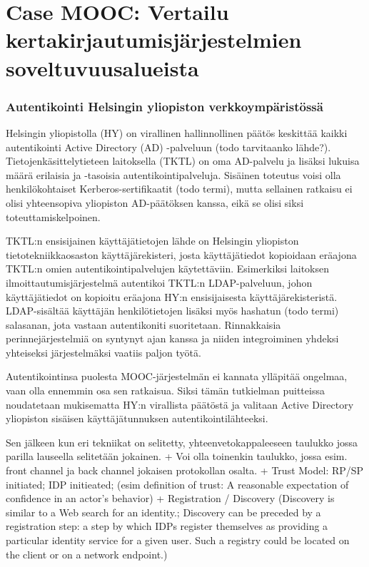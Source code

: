 \documentclass[finnish,gradu]{tktltiki}
\begin{document}
\section{Case MOOC: Vertailu kertakirjautumisjärjestelmien soveltuvuusalueista} %
\label{sec:kertakirjautumisjärjestelmien_}

  \subsubsection{Autentikointi Helsingin yliopiston verkkoympäristössä} %
  \label{ssub:autentikointi_helsingin_yliopiston_verkkoympäristössä}

  Helsingin yliopistolla (HY) on virallinen hallinnollinen päätös keskittää kaikki autentikointi Active Directory (AD) -palveluun (todo tarvitaanko lähde?).
  Tietojenkäsittelytieteen laitoksella (TKTL) on oma AD-palvelu ja lisäksi lukuisa määrä erilaisia ja -tasoisia autentikointipalveluja.
  Sisäinen toteutus voisi olla henkilökohtaiset Kerberos-sertifikaatit (todo termi), mutta sellainen ratkaisu ei olisi yhteensopiva yliopiston AD-päätöksen kanssa, eikä se olisi siksi toteuttamiskelpoinen.

  TKTL:n ensisijainen käyttäjätietojen lähde on Helsingin yliopiston tietotekniikkaosaston käyttäjärekisteri, josta käyttäjätiedot kopioidaan eräajona TKTL:n omien autentikointipalvelujen käytettäviin. Esimerkiksi laitoksen ilmoittautumisjärjestelmä autentikoi TKTL:n LDAP-palveluun, johon käyttäjätiedot on kopioitu eräajona HY:n ensisijaisesta käyttäjärekisteristä. LDAP-sisältää käyttäjän henkilötietojen lisäksi myös hashatun (todo termi) salasanan, jota vastaan autentikoniti suoritetaan. Rinnakkaisia perinnejärjestelmiä on syntynyt ajan kanssa ja niiden integroiminen yhdeksi yhteiseksi järjestelmäksi vaatiis paljon työtä.

  Autentikointinsa puolesta MOOC-järjestelmän ei kannata ylläpitää ongelmaa, vaan olla ennemmin osa sen ratkaisua. Siksi tämän tutkielman puitteissa noudatetaan mukisematta HY:n virallista päätöstä ja valitaan Active Directory yliopiston sisäisen käyttäjätunnuksen autentikointilähteeksi.


  Sen jälkeen kun eri tekniikat on selitetty, yhteenvetokappaleeseen taulukko jossa parilla lauseella selitetään jokainen.
  + Voi olla toinenkin taulukko, jossa esim. front channel ja back channel jokaisen protokollan osalta.
  + Trust Model: RP/SP initiated; IDP initieated; (esim definition of trust: A reasonable expectation of confidence in an actor’s behavior)
  + Registration / Discovery (Discovery is similar to a Web search for an identity.; Discovery can be preceded by a registration step: a step by which IDPs register themselves as providing a particular identity service for a given user. Such a registry could be located on the client or on a network endpoint.)
\end{document}
